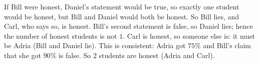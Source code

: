 If Bill were honest, Daniel's statement would be true, so exactly one student would be honest, but Bill and Daniel would both be honest. So Bill lies, and Carl, who says so, is honest. Bill's second statement is false, so Daniel lies; hence the number of honest students is not $1$. Carl is honest, so someone else is: it must be Adria (Bill and Daniel lie). This is consistent: Adria got $75\%$ and Bill's claim that she got $90\%$ is false. So $\boxed{2}$ students are honest (Adria and Carl).
